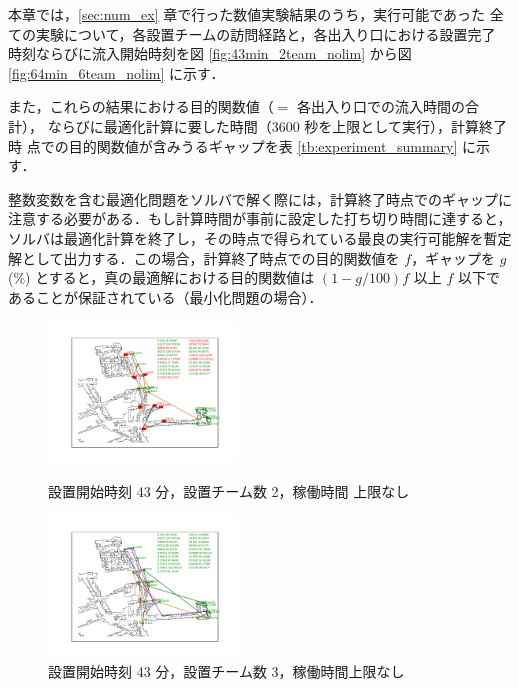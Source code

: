 \documentclass[a4paper,12pt,fleqn]{jarticle}
\begin{document}
本章では，\ref{sec:num_ex} 章で行った数値実験結果のうち，実行可能であった
全ての実験について，各設置チームの訪問経路と，各出入り口における設置完了
時刻ならびに流入開始時刻を図 \ref{fig:43min_2team_nolim} から図
\ref{fig:64min_6team_nolim} に示す．

また，これらの結果における目的関数値（$=$ 各出入り口での流入時間の合計），
ならびに最適化計算に要した時間（$3600$ 秒を上限として実行），計算終了時
点での目的関数値が含みうるギャップを表 \ref{tb:experiment_summary} に示
す．

整数変数を含む最適化問題をソルバで解く際には，計算終了時点でのギャップに
注意する必要がある．もし計算時間が事前に設定した打ち切り時間に達すると，
ソルバは最適化計算を終了し，その時点で得られている最良の実行可能解を暫定
解として出力する．この場合，計算終了時点での目的関数値を $f$，ギャップを
$g$(\%) とすると，真の最適解における目的関数値は $(1 - g/100)f$ 以上 $f$
以下であることが保証されている（最小化問題の場合）．

\newpage

\begin{figure}
 \begin{center}
  \begin{minipage}{0.49\hsize}
   \begin{center}
    \includegraphics[width=5cm,trim=100 50 100 50]{fig/43min_2team_nolim.pdf}
    \caption{設置開始時刻 43 分，\newline \quad 設置チーム数 2，稼働時間
    上限なし}
    \label{fig:43min_2team_nolim}
   \end{center}
  \end{minipage}
  \begin{minipage}{0.49\hsize}
   \begin{center}
    \includegraphics[width=5cm,trim=100 50 100 50]{fig/43min_3team_nolim.pdf}
    \caption{設置開始時刻 43 分，\newline \quad 設置チーム数 3，稼働時間上限なし}
    \label{fig:43min_3team_nolim}
   \end{center}
  \end{minipage}
 \end{center}
\end{figure}
\end{document}
